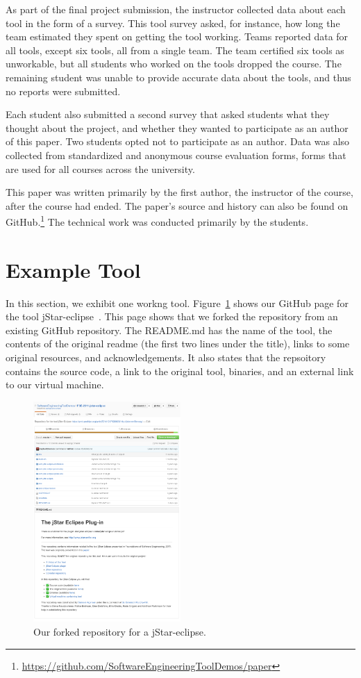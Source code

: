 \documentclass[10pt,conference]{IEEEtran}
\begin{document}
As part of the final project submission, 
the instructor collected data about 
each tool in the form of a survey.
This tool survey asked, for instance, how long
the team estimated they spent on getting 
the tool working.
Teams reported data for all tools, except six tools,
all from a single team.
The team certified six tools as unworkable,
but all students who worked on the tools dropped
the course.
The remaining student was unable 
to provide accurate data about the tools, and thus 
no reports were submitted.

Each student also submitted a second survey that
asked students what they thought about the project,
and whether they wanted to participate as an
author of this paper.
Two students opted not to participate as an author.
Data was also collected from standardized and 
anonymous course evaluation forms, forms
that are used for all courses 
across the university.

This paper was written primarily by the first author,
the instructor of the course, after the course 
had ended.
The paper's source and history can also be found 
on GitHub.\footnote{\url{https://github.com/SoftwareEngineeringToolDemos/paper}}
The technical work was conducted primarily by the students.

\section{Example Tool}

In this section, we exhibit one workng tool.
Figure~\ref{fig:jstar} shows our GitHub page for
the tool jStar-eclipse~\cite{jstar}.
This page shows that we forked
the repository from an existing GitHub repository.
The README.md has the name of the tool, 
the contents of the original readme 
(the first two lines under the title),
links to some original resources,
and acknowledgements.
It also states that the repsoitory contains
the source code, a link to the original tool,
binaries, and an external link to our virtual
machine. 


\begin{figure}[t]
  \centering
    \includegraphics[width=0.5\textwidth]{jstar.png}
  \caption{Our forked repository for a jStar-eclipse.}\label{fig:jstar}
\end{figure}
\end{document}
